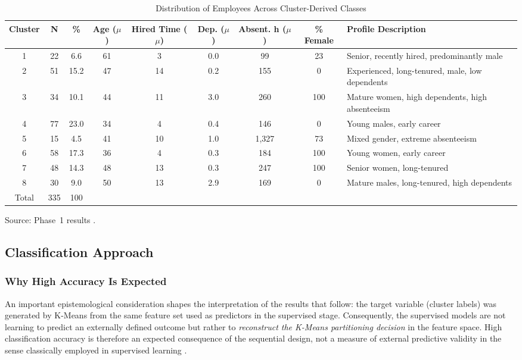 \documentclass[alpha-refs,english]{RBCA_v3.0}
\begin{document}
\begin{table}[!b]
    \centering
    \begin{threeparttable}
    \caption{Distribution of Employees Across Cluster-Derived Classes}
    \label{tab:distribution}
    \begin{tabularx}{\textwidth}{cccccccc>{\raggedright\arraybackslash}X}
        \toprule
        Cluster & N & \% & Age ($\mu$) & Hired Time ($\mu$) & Dep. ($\mu$) & Absent. h ($\mu$) & \% Female & Profile Description \\
        \midrule
        1 & 22  & 6.6  & 61 & 3  & 0.0 & 99    & 23  & Senior, recently hired, predominantly male \\
        2 & 51  & 15.2 & 47 & 14 & 0.2 & 155   & 0   & Experienced, long-tenured, male, low dependents \\
        3 & 34  & 10.1 & 44 & 11 & 3.0 & 260   & 100 & Mature women, high dependents, high absenteeism \\
        4 & 77  & 23.0 & 34 & 4  & 0.4 & 146   & 0   & Young males, early career \\
        5 & 15  & 4.5  & 41 & 10 & 1.0 & 1{,}327 & 73  & Mixed gender, extreme absenteeism \\
        6 & 58  & 17.3 & 36 & 4  & 0.3 & 184   & 100 & Young women, early career \\
        7 & 48  & 14.3 & 48 & 13 & 0.3 & 247   & 100 & Senior women, long-tenured \\
        8 & 30  & 9.0  & 50 & 13 & 2.9 & 169   & 0   & Mature males, long-tenured, high dependents \\
        \midrule
        Total & 335 & 100 & & & & & & \\
        \bottomrule
    \end{tabularx}
    \begin{tablenotes}
        \footnotesize
        \item Source: Phase~1 results \citep{Moreira2026}.
    \end{tablenotes}
    \end{threeparttable}
\end{table}

\subsection{Classification Approach}

\subsubsection{Why High Accuracy Is Expected}
\label{sec:why_high}
An important epistemological consideration shapes the interpretation of the results that follow: the target variable (cluster labels) was generated by K-Means from the same feature set used as predictors in the supervised stage. Consequently, the supervised models are not learning to predict an externally defined outcome but rather to \textit{reconstruct the K-Means partitioning decision} in the feature space. High classification accuracy is therefore an expected consequence of the sequential design, not a measure of external predictive validity in the sense classically employed in supervised learning \citep{Hastie2009}.
\end{document}
